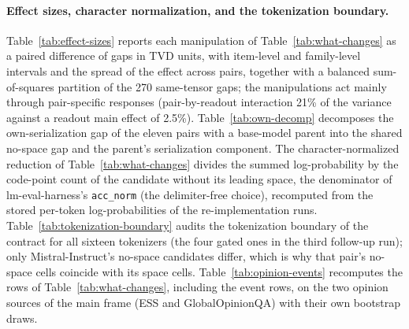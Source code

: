 \documentclass[11pt]{article}
\begin{document}
\paragraph{Effect sizes, character normalization, and the tokenization boundary.}
Table~\ref{tab:effect-sizes} reports each manipulation of Table~\ref{tab:what-changes} as a paired difference of gaps in TVD units, with item-level and family-level intervals and the spread of the effect across pairs, together with a balanced sum-of-squares partition of the 270 same-tensor gaps; the manipulations act mainly through pair-specific responses (pair-by-readout interaction 21\% of the variance against a readout main effect of 2.5\%). Table~\ref{tab:own-decomp} decomposes the own-serialization gap of the eleven pairs with a base-model parent into the shared no-space gap and the parent's serialization component. The character-normalized reduction of Table~\ref{tab:what-changes} divides the summed log-probability by the code-point count of the candidate without its leading space, the denominator of lm-eval-harness's \texttt{acc\_norm} (the delimiter-free choice), recomputed from the stored per-token log-probabilities of the re-implementation runs. Table~\ref{tab:tokenization-boundary} audits the tokenization boundary of the contract for all sixteen tokenizers (the four gated ones in the third follow-up run); only Mistral-Instruct's no-space candidates differ, which is why that pair's no-space cells coincide with its space cells. Table~\ref{tab:opinion-events} recomputes the rows of Table~\ref{tab:what-changes}, including the event rows, on the two opinion sources of the main frame (ESS and GlobalOpinionQA) with their own bootstrap draws.





\FloatBarrier









\FloatBarrier

\FloatBarrier







\end{document}

